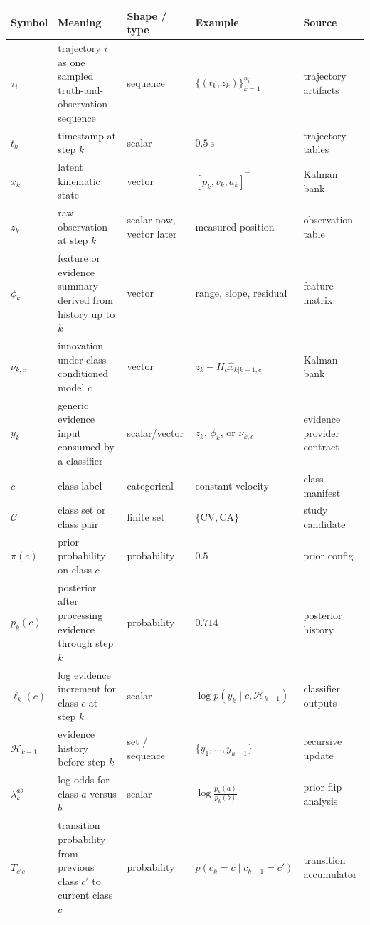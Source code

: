 \small
\setlength{\tabcolsep}{4pt}
\begin{tabularx}{\textwidth}{>{\raggedright\arraybackslash}p{}X>{\raggedright\arraybackslash}p{}>{\raggedright\arraybackslash}p{}>{\raggedright\arraybackslash}p{}}
\toprule
Symbol & Meaning & Shape / type & Example & Source \\
\midrule
\(\tau_i\) & trajectory \(i\) as one sampled truth-and-observation sequence & sequence & \(\{(t_k, z_k)\}_{k=1}^{n_i}\) & trajectory artifacts \\
\(t_k\) & timestamp at step \(k\) & scalar & \(0.5\ \mathrm{s}\) & trajectory tables \\
\(x_k\) & latent kinematic state & vector & \([p_k, v_k, a_k]^\top\) & Kalman bank \\
\(z_k\) & raw observation at step \(k\) & scalar now, vector later & measured position & observation table \\
\(\phi_k\) & feature or evidence summary derived from history up to \(k\) & vector & range, slope, residual & feature matrix \\
\(\nu_{k,c}\) & innovation under class-conditioned model \(c\) & vector & \(z_k - H_c \hat{x}_{k|k-1,c}\) & Kalman bank \\
\(y_k\) & generic evidence input consumed by a classifier & scalar/vector & \(z_k\), \(\phi_k\), or \(\nu_{k,c}\) & evidence provider contract \\
\(c\) & class label & categorical & constant velocity & class manifest \\
\(\mathcal{C}\) & class set or class pair & finite set & \(\{\mathrm{CV}, \mathrm{CA}\}\) & study candidate \\
\(\pi(c)\) & prior probability on class \(c\) & probability & \(0.5\) & prior config \\
\(p_k(c)\) & posterior after processing evidence through step \(k\) & probability & \(0.714\) & posterior history \\
\(\ell_k(c)\) & log evidence increment for class \(c\) at step \(k\) & scalar & \(\log p(y_k \mid c, \mathcal{H}_{k-1})\) & classifier outputs \\
\(\mathcal{H}_{k-1}\) & evidence history before step \(k\) & set / sequence & \(\{y_1,\dots,y_{k-1}\}\) & recursive update \\
\(\lambda_k^{ab}\) & log odds for class \(a\) versus \(b\) & scalar & \(\log \frac{p_k(a)}{p_k(b)}\) & prior-flip analysis \\
\(T_{c'c}\) & transition probability from previous class \(c'\) to current class \(c\) & probability & \(p(c_k=c \mid c_{k-1}=c')\) & transition accumulator \\

\end{tabularx}
